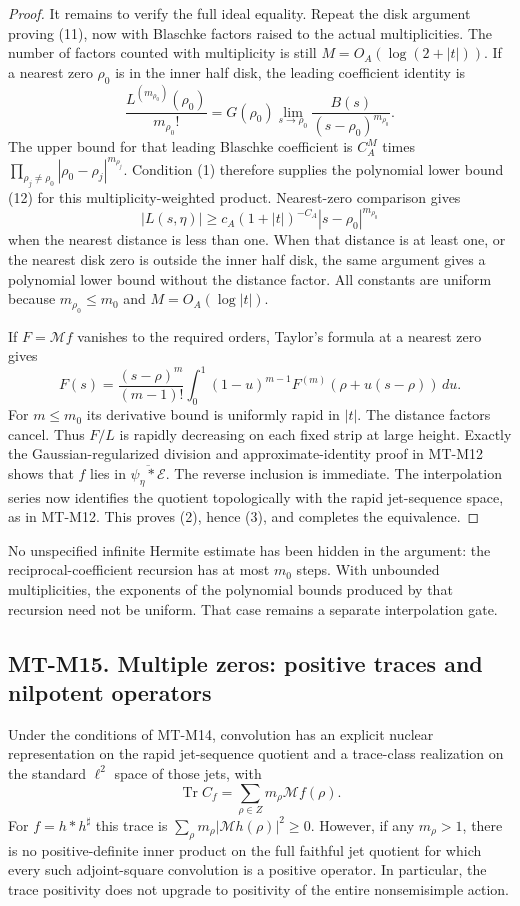 \begin{proof}
It remains to verify the full ideal equality.
Repeat the disk argument proving (11), now with
Blaschke factors raised to the actual multiplicities.
The number of factors counted with multiplicity is still
$M=O_A(\log(2+|t|))$. If a nearest zero $\rho_0$
is in the inner half disk, the leading coefficient
identity is
\[
 \frac{L^{(m_{\rho_0})}(\rho_0)}{m_{\rho_0}!}
   =G(\rho_0)
       \lim_{s\to\rho_0}
                    \frac{B(s)}{(s-\rho_0)^{m_{\rho_0}}}.
\]
The upper bound for that leading Blaschke coefficient
is $C_A^M$ times
$\prod_{\rho_j\ne\rho_0}
          |\rho_0-\rho_j|^{m_{\rho_j}}$.
Condition (1) therefore supplies the polynomial lower
bound (12) for this multiplicity-weighted product.
Nearest-zero comparison gives
\[
 |L(s,\eta)|\ge c_A(1+|t|)^{-C_A}
                         |s-\rho_0|^{m_{\rho_0}}
\]
when the nearest distance is less than one.
When that distance is at least one, or the nearest
disk zero is outside the inner half disk, the same
argument gives a polynomial lower bound without
the distance factor. All constants are uniform
because $m_{\rho_0}\le m_0$ and $M=O_A(\log|t|)$.

If $F=\mathcal Mf$ vanishes to the required orders,
Taylor's formula at a nearest zero gives
\[
 F(s)=\frac{(s-\rho)^m}{(m-1)!}
       \int_0^1(1-u)^{m-1}
                         F^{(m)}(\rho+u(s-\rho))\,du .
\]
For $m\le m_0$ its derivative bound is uniformly
rapid in $|t|$. The distance factors cancel.
Thus $F/L$ is rapidly decreasing on each fixed
strip at large height. Exactly the Gaussian-regularized
division and approximate-identity proof in MT-M12
shows that $f$ lies in
$\overline{\psi_\eta*\mathcal E}$.
The reverse inclusion is immediate.
The interpolation series now identifies the quotient
topologically with the rapid jet-sequence space,
as in MT-M12. This proves (2), hence (3), and
completes the equivalence.
\end{proof}

No unspecified infinite Hermite estimate has been hidden in
the argument: the reciprocal-coefficient recursion has at most
$m_0$ steps. With unbounded multiplicities, the exponents of
the polynomial bounds produced by that recursion need not be
uniform. That case remains a separate interpolation gate.

\subsection*{MT-M15. Multiple zeros: positive traces and nilpotent operators}
Under the conditions of MT-M14, convolution has an explicit
nuclear representation on the rapid jet-sequence quotient
and a trace-class realization on the standard $\ell^2$
space of those jets, with
\[
          \operatorname{Tr}C_f
                    =\sum_{\rho\in Z}m_\rho\mathcal Mf(\rho).
                                                               \tag{MT-M15}
\]
For $f=h*h^\sharp$ this trace is
$\sum_\rho m_\rho|\mathcal Mh(\rho)|^2\ge0$.
However, if any $m_\rho>1$, there is no positive-definite
inner product on the full faithful jet quotient for which
every such adjoint-square convolution is a positive
operator. In particular, the trace positivity does not
upgrade to positivity of the entire nonsemisimple action.

